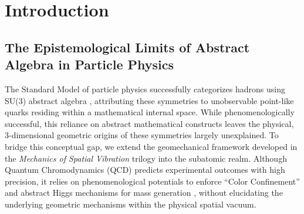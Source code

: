 \documentclass[reprint,amsmath,amssymb,aps,prd]{revtex4-2}
\begin{document}
\begin{abstract}
Addressing the critical inconsistency between discrete topological variables and continuous differential equations, we reformulate the decay of ``Strangeness'' (Weak Interaction) not as continuous viscous damping, but as discontinuous topological jumps governed by quantum instanton tunneling rates ($\Gamma \propto e^{-S_{\mathrm{inst}}/\hbar}$). The Pauli Exclusion Principle is geometrically re-evaluated not as classical hydrodynamic repulsion, but as an infinite topological deformation energy barrier mandated by the interference of $4\pi$-twisted spinor phase planes. By replacing internal dimensions with the emergent topological dynamics of a 3D spatial vacuum, this study offers a mathematically consistent, deterministic realization of hadronic symmetries under the universal principle of \textbf{`Fractal Scale Symmetry'}.
\end{abstract}

\maketitle

\section{Introduction}

\subsection{The Epistemological Limits of Abstract Algebra in Particle Physics}
The Standard Model of particle physics successfully categorizes hadrons using SU(3) abstract algebra \cite{GellMann1964}, attributing these symmetries to unobservable point-like quarks residing within a mathematical internal space. While phenomenologically successful, this reliance on abstract mathematical constructs leaves the physical, 3-dimensional geometric origins of these symmetries largely unexplained. To bridge this conceptual gap, we extend the geomechanical framework developed in the \textit{Mechanics of Spatial Vibration} trilogy \cite{YooPart1, YooPart2, YooPart3} into the subatomic realm. Although Quantum Chromodynamics (QCD) predicts experimental outcomes with high precision, it relies on phenomenological potentials to enforce ``Color Confinement'' \cite{Wilson1974} and abstract Higgs mechanisms for mass generation \cite{Higgs1964}, without elucidating the underlying geometric mechanisms within the physical spatial vacuum.
\end{document}
